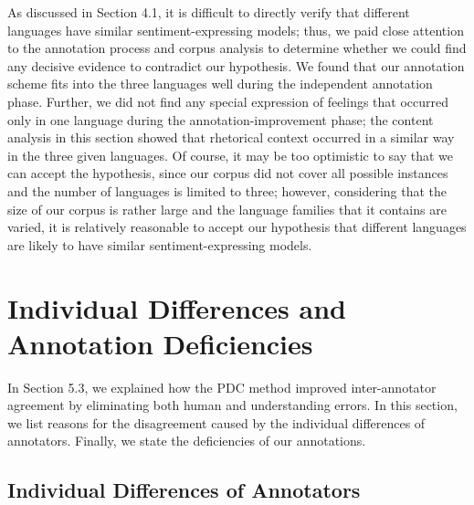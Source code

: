 \documentclass[english]{jnlp_1.4}
\begin{document}
As discussed in Section 4.1, it is difficult to directly verify that different languages have similar sentiment-expressing models; thus, we paid close attention to the annotation process and corpus analysis to determine whether we could find any decisive evidence to contradict our hypothesis. We found that our annotation scheme fits into the three languages well during the independent annotation phase. Further, we did not find any special expression of feelings that occurred only in one language during the annotation-improvement phase; the content analysis in this section showed that rhetorical context occurred in a similar way in the three given languages. Of course, it may be too optimistic to say that we can accept the hypothesis, since our corpus did not cover all possible instances and the number of languages is limited to three; however, considering that the size of our corpus is rather large and the language families that it contains are varied, it is relatively reasonable to accept our hypothesis that different languages are likely to have similar sentiment-expressing models.


\section{Individual Differences and Annotation Deficiencies}

In Section 5.3, we explained how the PDC method improved inter-annotator agreement by eliminating both human and understanding errors. In this section, we list reasons for the disagreement caused by the individual differences of annotators. Finally, we state the deficiencies of our annotations.


\subsection{Individual Differences of Annotators}
\end{document}
